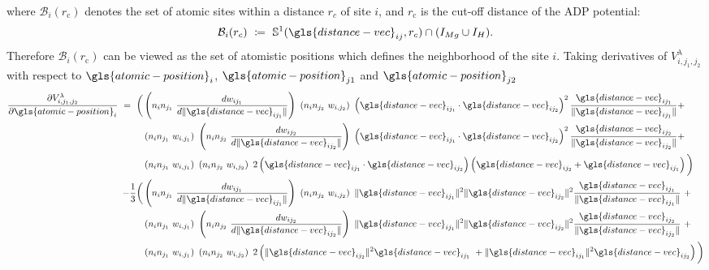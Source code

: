 \documentclass{article}
\begin{document}
where $\mathcal{B}_i(r_\text{c})$ denotes the set of atomic sites within a distance $r_c$ of site $i$, and $r_\text{c}$ is the cut-off distance of the ADP potential:
\begin{equation}
    \mathcal{B}_i(r_c)\ \coloneqq\ \mathbb{S}^1(\gls{distance-vec}_{ij}, r_c) \cap (I_{Mg} \cup I_{H}).
\end{equation}
Therefore $\mathcal{B}_i(r_\text{c})$ can be viewed as the set of atomistic positions which defines the neighborhood of the site $i$. Taking derivatives of $V^{\lambda}_{i,j_1,j_2}$ with respect to $\gls{atomic-position}_i$, $\gls{atomic-position}_{j1}$ and $\gls{atomic-position}_{j2}$
\begin{equation}
\begin{split}
\frac{\partial V^{\lambda}_{i,j_1,j_2}}{\partial \gls{atomic-position}_i}\ =\ \bigg(&\left(n_i n_{j_1}\ \frac{d w_{ij_1}}{ d \| \gls{distance-vec}_{ij_1} \|} \right) \left(n_i n_{j_2}\ w_{i,j_2}\right)\ \left(\gls{distance-vec}_{ij_1} \cdot \gls{distance-vec}_{ij_2} \right)^2 \frac{\gls{distance-vec}_{ij_1}}{\| \gls{distance-vec}_{ij_1} \|} +\ \\ 
&\left(n_i n_{j_1}\ w_{i,j_1}\right) \left(n_i n_{j_2}\ \frac{d w_{ij_2}}{ d \| \gls{distance-vec}_{ij_2} \|} \right)\ \left(\gls{distance-vec}_{ij_1} \cdot \gls{distance-vec}_{ij_2} \right)^2 \frac{\gls{distance-vec}_{i j_2}}{\| \gls{distance-vec}_{i j_2} \|} +\ \\
&\left(n_i n_{j_1}\ w_{i,j_1}\right) \left(n_i n_{j_2}\ w_{i,j_2}\right)\ 2 \left(\gls{distance-vec}_{ij_1} \cdot \gls{distance-vec}_{ij_2} \right) \left(\gls{distance-vec}_{ij_2} + \gls{distance-vec}_{ij_1} \right)\bigg) \\
- \frac{1}{3}\bigg(&\left(n_i n_{j_1}\ \frac{d w_{ij_1}}{ d \| \gls{distance-vec}_{ij_1} \|} \right)\ \left(n_i n_{j_2}\ w_{i,j_2}\right)\ \| \gls{distance-vec}_{ij_1} \|^2 \| \gls{distance-vec}_{ij_2} \|^2 \frac{\gls{distance-vec}_{ij_1}}{\| \gls{distance-vec}_{ij_1} \|} +\ \\
&\left(n_i n_{j_1}\ w_{i,j_1}\right) \left(n_i n_{j_2}\ \frac{d w_{ij_2}}{ d \| \gls{distance-vec}_{ij_2} \|} \right)\ \| \gls{distance-vec}_{ij_1} \|^2 \| \gls{distance-vec}_{ij_2} \|^2 \frac{\gls{distance-vec}_{i j_2}}{\| \gls{distance-vec}_{i j_2} \|} +\ \\
&\left(n_i n_{j_1}\ w_{i,j_1}\right)\ \left(n_i n_{j_2}\ w_{i,j_2}\right)\ 2 \left(\| \gls{distance-vec}_{ij_2} \|^2 \gls{distance-vec}_{ij_1} + \| \gls{distance-vec}_{ij_1} \|^2 \gls{distance-vec}_{ij_2}\right)\bigg)    
\end{split}
\end{equation}
\end{document}
